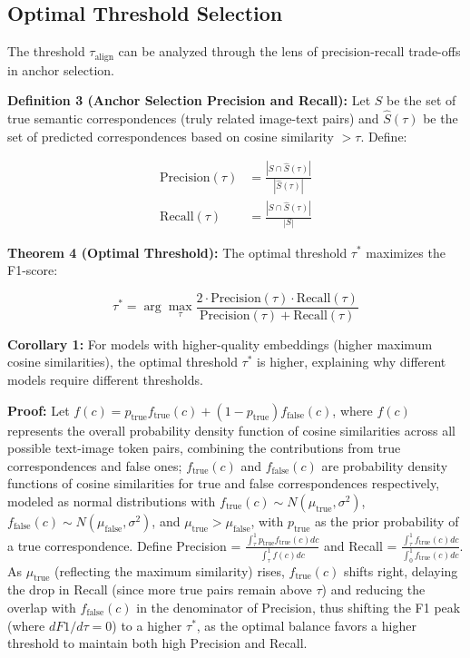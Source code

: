 \documentclass[11pt]{article}
\begin{document}
\subsection{Optimal Threshold Selection}

The threshold $\tau_{\text{align}}$ can be analyzed through the lens of precision-recall trade-offs in anchor selection.

\textbf{Definition 3 (Anchor Selection Precision and Recall):} Let $S$ be the set of true semantic correspondences (truly related image-text pairs) and $\hat{S}(\tau)$ be the set of predicted correspondences based on cosine similarity $> \tau$. Define:

\begin{align}
\text{Precision}(\tau) &= \frac{|S \cap \hat{S}(\tau)|}{|\hat{S}(\tau)|} \\
\text{Recall}(\tau) &= \frac{|S \cap \hat{S}(\tau)|}{|S|}
\end{align}

\textbf{Theorem 4 (Optimal Threshold):} The optimal threshold $\tau^*$ maximizes the F1-score:

\begin{equation}
\tau^* = \arg \max_\tau \frac{2 \cdot \text{Precision}(\tau) \cdot \text{Recall}(\tau)}{\text{Precision}(\tau) + \text{Recall}(\tau)}
\end{equation}

\textbf{Corollary 1:} For models with higher-quality embeddings (higher maximum cosine similarities), the optimal threshold $\tau^*$ is higher, explaining why different models require different thresholds.

\textbf{Proof:} Let $f(c) = p_{\text{true}} f_{\text{true}}(c) + (1 - p_{\text{true}}) f_{\text{false}}(c)$, where $f(c)$ represents the overall probability density function of cosine similarities across all possible text-image token pairs, combining the contributions from true correspondences and false ones; $f_{\text{true}}(c)$ and $f_{\text{false}}(c)$ are probability density functions of cosine similarities for true and false correspondences respectively, modeled as normal distributions with $f_{\text{true}}(c) \sim N(\mu_{\text{true}}, \sigma^2)$, $f_{\text{false}}(c) \sim N(\mu_{\text{false}}, \sigma^2)$, and $\mu_{\text{true}} > \mu_{\text{false}}$, with $p_{\text{true}}$ as the prior probability of a true correspondence. Define Precision = $\frac{\int_\tau^1 p_{\text{true}} f_{\text{true}}(c) dc}{\int_\tau^1 f(c) dc}$ and Recall = $\frac{\int_\tau^1 f_{\text{true}}(c) dc}{\int_0^1 f_{\text{true}}(c) dc}$. As $\mu_{\text{true}}$ (reflecting the maximum similarity) rises, $f_{\text{true}}(c)$ shifts right, delaying the drop in Recall (since more true pairs remain above $\tau$) and reducing the overlap with $f_{\text{false}}(c)$ in the denominator of Precision, thus shifting the F1 peak (where $dF1/d\tau = 0$) to a higher $\tau^*$, as the optimal balance favors a higher threshold to maintain both high Precision and Recall.
\end{document}
